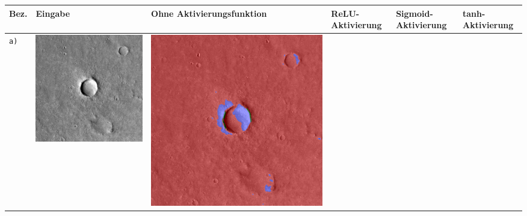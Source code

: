 \begin{table}[h!]
	\setlength\tabcolsep{0pt}
	\begin{tabularx}{\textwidth}{>{\centering}m{}
			>{\centering}m{}
			>{\centering}m{}
			>{\centering}m{}
			>{\centering}m{}
			>{\centering\arraybackslash}m{}}
		\toprule
		Bez. &
		Eingabe & 
		Ohne Aktivierungsfunktion &
		ReLU-Aktivierung &
		Sigmoid-Aktivierung &
		tanh-Aktivierung \\
		\midrule
		\texttt{a)} &
		\includegraphics[width=0.9\linewidth]{images/p03/p03_01.png} &
		\includegraphics[width=0.9\linewidth]{images/gen/activation_functions/p03_01.png_None.png} &

\end{tabularx}
\end{table}
